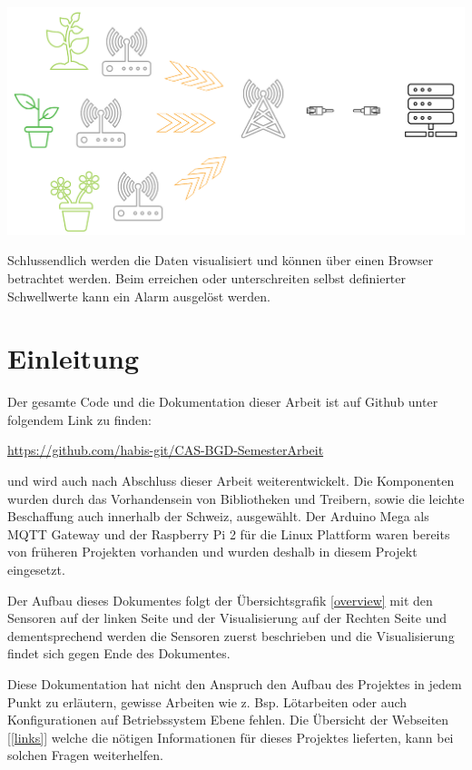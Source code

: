 \documentclass[
  12pt, %
  a4paper, %
  oneside, %
  openany, 
  numbers=noenddot, %
  BCOR=5mm, %
  parskip=half*, %
  thesis, %
]{bfhbook}
\begin{document}
  \begin{center}
    \includegraphics[width=14cm, left]{Bilder/Overview-2.png}
     \captionsetup{justification=centering}
  \end{center}
  Schlussendlich werden die Daten visualisiert und können über einen Browser betrachtet werden. Beim erreichen oder unterschreiten selbst definierter Schwellwerte kann ein Alarm ausgelöst werden.
\chapter{Einleitung}
Der gesamte Code und die Dokumentation dieser Arbeit ist auf Github unter folgendem Link zu finden:

 \url{https://github.com/habis-git/CAS-BGD-SemesterArbeit} 
 
 und wird auch nach Abschluss dieser Arbeit weiterentwickelt. Die Komponenten wurden durch das Vorhandensein von Bibliotheken und Treibern, sowie die leichte Beschaffung auch innerhalb der Schweiz, ausgewählt. Der Arduino Mega als MQTT Gateway und der Raspberry Pi 2 für die Linux Plattform waren bereits von früheren Projekten vorhanden und wurden deshalb in diesem Projekt eingesetzt.

Der Aufbau dieses Dokumentes folgt der Übersichtsgrafik  \ref{overview} mit den Sensoren auf der linken Seite und der Visualisierung auf der Rechten Seite und dementsprechend werden die Sensoren zuerst beschrieben und die Visualisierung findet sich gegen Ende des Dokumentes.

Diese Dokumentation hat nicht den Anspruch den Aufbau des Projektes in jedem Punkt zu erläutern, gewisse Arbeiten wie z. Bsp. Lötarbeiten oder auch Konfigurationen auf Betriebssystem Ebene fehlen. Die Übersicht der Webseiten [\ref{links}] welche die nötigen Informationen für dieses Projektes lieferten, kann bei solchen Fragen weiterhelfen.
\end{document}
